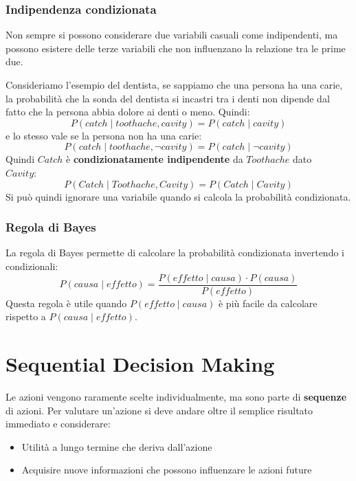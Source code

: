 \documentclass[a4paper]{article}
\begin{document}
\subsubsection{Indipendenza condizionata}
Non sempre si possono considerare due variabili casuali come indipendenti, ma 
possono esistere delle terze variabili che non influenzano la relazione tra le prime due.
\begin{example}
  Consideriamo l'esempio del dentista, se sappiamo che una persona ha una carie, la
  probabilità che la sonda del dentista si incastri tra i denti non dipende dal fatto che
  la persona abbia dolore ai denti o meno. Quindi:
  \[
    P(catch \;|\; toothache, cavity) = P(catch \;|\; cavity)
  \] 
  e lo stesso vale se la persona non ha una carie:
  \[
    P(catch \;|\; toothache, \neg cavity) = P(catch \;|\; \neg cavity)
  \] 
  Quindi \( Catch \) è \textbf{condizionatamente indipendente} da \( Toothache \) dato\\
  \( Cavity \):
  \[
    P(Catch \;|\; Toothache, Cavity) = P(Catch \;|\; Cavity)
  \] 
  Si può quindi ignorare una variabile quando si calcola la probabilità condizionata.
\end{example}

\subsubsection{Regola di Bayes}
La regola di Bayes permette di calcolare la probabilità condizionata invertendo
i condizionali:
\[
  P(causa \;|\; effetto) = \frac{P(effetto \;|\; causa) \cdot P(causa)}{P(effetto)}
\]
Questa regola è utile quando \( P(effetto \;|\; causa) \) è più facile da calcolare rispetto a
\( P(causa \;|\; effetto) \).

\section{Sequential Decision Making}
Le azioni vengono raramente scelte individualmente, ma sono parte di \textbf{sequenze} di azioni.
Per valutare un'azione si deve andare oltre il semplice risultato immediato e considerare:
\begin{itemize}
  \item Utilità a lungo termine che deriva dall'azione
  \item Acquisire nuove informazioni che possono influenzare le azioni future
\end{itemize}
\end{document}
